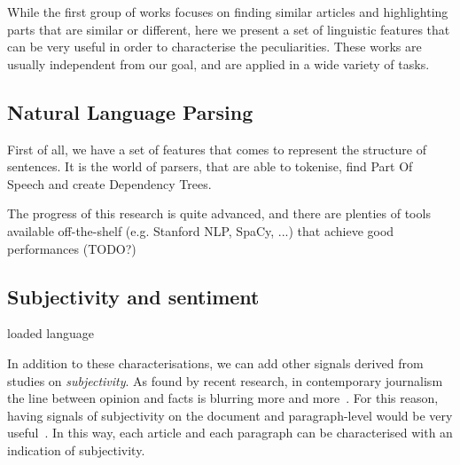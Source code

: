 While the first group of works focuses on finding similar articles and highlighting parts that are similar or different, here we present a set of linguistic features that can be very useful in order to characterise the peculiarities. These works are usually independent from our goal, and are applied in a wide variety of tasks.

\subsection{Natural Language Parsing}

First of all, we have a set of features that comes to represent the structure of sentences. It is the world of parsers, that are able to tokenise, find Part Of Speech and create Dependency Trees.

The progress of this research is quite advanced, and there are plenties of tools available off-the-shelf (e.g. Stanford NLP, SpaCy, ...) that achieve good performances (TODO?)



\subsection{Subjectivity and sentiment}

loaded language

In addition to these characterisations, we can add other signals derived from studies on \emph{subjectivity}.
As found by recent research, in contemporary journalism the line between opinion and facts is blurring more and more~\cite{blake2019news}. For this reason, having signals of subjectivity on the document and paragraph-level would be very useful~\cite{liu2010sentiment}.
In this way, each article and each paragraph can be characterised with an indication of subjectivity.


